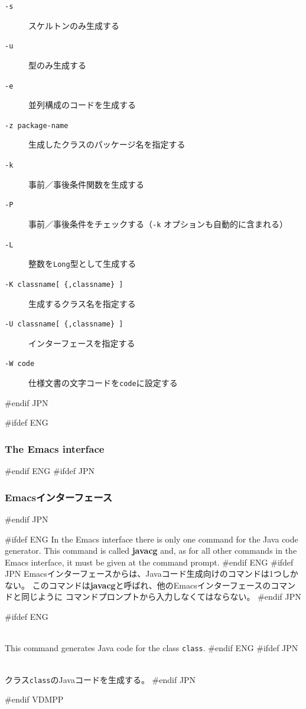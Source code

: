 \documentclass[\pformat,12pt]{article}
\newcommand{\OptPt}[1]{[\ #1\ ]}
\begin{document}
\begin{description}
\item[{\tt -s}] スケルトンのみ生成する

\item[{\tt -u}] 型のみ生成する

\item[{\tt -e}] 並列構成のコードを生成する

\item[{\tt -z package-name}] 生成したクラスのパッケージ名を指定する

\item[{\tt -k}] 事前／事後条件関数を生成する

\item[{\tt -P}] 事前／事後条件をチェックする（{\tt -k} オプションも自動的に含まれる）

\item[{\tt -L}] 整数を{\tt Long}型として生成する

\item[{\tt -K classname\OptPt{\{,classname\}}}] 生成するクラス名を指定する

\item[{\tt -U classname\OptPt{\{,classname\}}}] インターフェースを指定する

\item[{\tt -W code}] 仕様文書の文字コードを{\tt code}に設定する
\end{description}
#endif JPN

#ifdef ENG
\subsubsection{The Emacs interface}
#endif ENG
#ifdef JPN
\subsubsection{Emacsインターフェース}
#endif JPN

#ifdef ENG
In the Emacs interface there is only one command for the Java code generator.
This command is called \textbf{javacg}
and, as for all other commands in the Emacs interface, it must be given at
the command prompt.
#endif ENG
#ifdef JPN
Emacsインターフェースからは、Javaコード生成向けのコマンドは1つしかない。
このコマンドは\textbf{javacg}と呼ばれ、他のEmacsインターフェースのコマンドと同じように
コマンドプロンプトから入力しなくてはならない。
#endif JPN

\begin{description}
#ifdef ENG
\item[*javacg (jcg) {\tt class} {[}{\tt options}{]}]   \mbox{}\\
  This command generates Java code for the class {\tt class}.
#endif ENG
#ifdef JPN
\item[*javacg (jcg) {\tt class} {[}{\tt options}{]}] 
  \mbox{}\\
  クラス{\tt class}のJavaコードを生成する。
#endif JPN
\end{description}
#endif VDMPP
\end{document}
